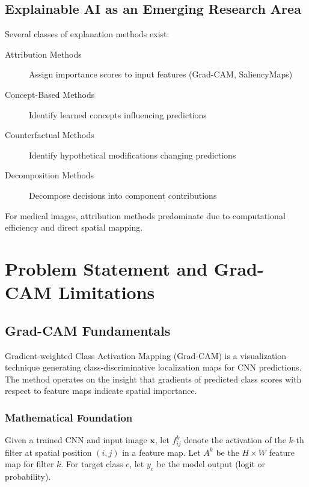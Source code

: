 \documentclass[12pt,a4paper,oneside]{book}
\begin{document}
\section{Explainable AI as an Emerging Research Area}

Several classes of explanation methods exist:

\begin{description}
  \item[Attribution Methods] Assign importance scores to input features (Grad-CAM, SaliencyMaps)
  \item[Concept-Based Methods] Identify learned concepts influencing predictions
  \item[Counterfactual Methods] Identify hypothetical modifications changing predictions
  \item[Decomposition Methods] Decompose decisions into component contributions
\end{description}

For medical images, attribution methods predominate due to computational efficiency and direct spatial mapping.

\chapter{Problem Statement and Grad-CAM Limitations}
\label{ch:problem}

\section{Grad-CAM Fundamentals}

Gradient-weighted Class Activation Mapping (Grad-CAM) is a visualization technique generating class-discriminative localization maps for CNN predictions. The method operates on the insight that gradients of predicted class scores with respect to feature maps indicate spatial importance.

\subsection{Mathematical Foundation}

Given a trained CNN and input image $\mathbf{x}$, let $f_{ij}^k$ denote the activation of the $k$-th filter at spatial position $(i,j)$ in a feature map. Let $A^k$ be the $H \times W$ feature map for filter $k$. For target class $c$, let $y_c$ be the model output (logit or probability).
\end{document}
